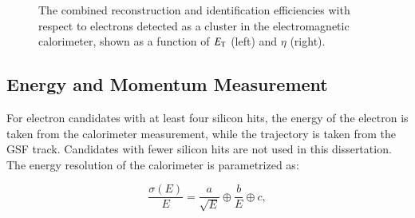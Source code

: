 \begin{figure}[htbp]
{		
	}
	\caption{The combined reconstruction and identification efficiencies with respect to electrons detected as a cluster in the electromagnetic calorimeter, shown as a function of $E_{\mathrm{T}}$ (left) and $\eta$ (right).}
	\label{fig:electron-id-efficiencies}
\end{figure}


\subsection{Energy and Momentum Measurement}\label{sec:reco-electron-energymomentum}
For electron candidates with at least four silicon hits, the energy of the electron is taken from the calorimeter measurement, while the trajectory is taken from the GSF track. Candidates with fewer silicon hits are not used in this dissertation. The energy resolution of the calorimeter is parametrized as:

\begin{equation}
	\frac{\sigma(E)}{E} = \frac{a}{\sqrt{E}} \oplus \frac{b}{E} \oplus c,
\end{equation}

